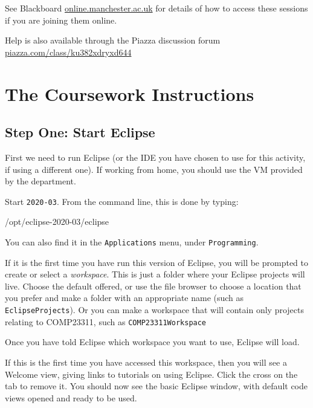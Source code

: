 \documentclass[
]{book}
\newenvironment{Shaded}{\begin{snugshade}}{\end{snugshade}}
\newcommand{\NormalTok}[1]{#1}
\begin{document}
See Blackboard \href{https://online.manchester.ac.uk}{online.manchester.ac.uk} for details of how to access these sessions if you are joining them online.

Help is also available through the Piazza discussion forum \href{https://piazza.com/class/ku382xdryxd644}{piazza.com/class/ku382xdryxd644}

\hypertarget{instructions}{%
\section{The Coursework Instructions}\label{instructions}}

\hypertarget{starteclipse}{%
\subsection{Step One: Start Eclipse}\label{starteclipse}}

First we need to run Eclipse (or the IDE you have chosen to use for this activity, if using a different one). If working from home, you should use the VM provided by the department.

Start \texttt{2020-03}. From the command line, this is done by typing:

\begin{Shaded}
\begin{Highlighting}[]
\NormalTok{/opt/eclipse{-}2020{-}03/eclipse}
\end{Highlighting}
\end{Shaded}

You can also find it in the \texttt{Applications} menu, under \texttt{Programming}.

If it is the first time you have run this version of Eclipse, you will be prompted to create or select a \emph{workspace}. This is just a folder where your Eclipse projects will live. Choose the default offered, or use the file browser to choose a location that you prefer and make a folder with an appropriate name (such as \texttt{EclipseProjects}). Or you can make a workspace that will contain only projects relating to COMP23311, such as \texttt{COMP23311Workspace}

Once you have told Eclipse which workspace you want to use, Eclipse will load.

If this is the first time you have accessed this workspace, then you will see a Welcome view, giving links to tutorials on using Eclipse. Click the cross on the tab to remove it. You should now see the basic Eclipse window, with default code views opened and ready to be used.
\end{document}
